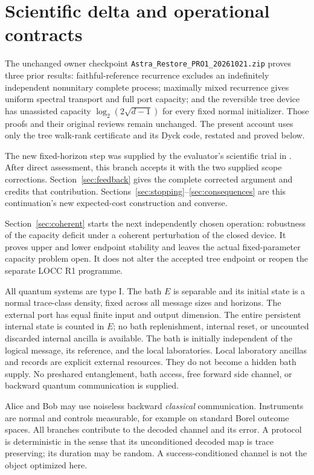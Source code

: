 \documentclass[11pt]{article}
\begin{document}
\section{Scientific delta and operational contracts}

The unchanged owner checkpoint \texttt{Astra\_Restore\_PRO1\_20261021.zip} proves three prior results: faithful-reference recurrence excludes an indefinitely independent nonunitary complete process; maximally mixed recurrence gives uniform spectral transport and full port capacity; and the reversible tree device has unassisted capacity $\log_2(2\sqrt{d-1})$ for every fixed normal initializer. Those proofs and their original reviews remain unchanged. The present account uses only the tree walk-rank certificate and its Dyck code, restated and proved below.

The new fixed-horizon step was supplied by the evaluator's scientific trial in . After direct assessment, this branch accepts it with the two supplied scope corrections. Section~\ref{sec:feedback} gives the complete corrected argument and credits that contribution. Sections~\ref{sec:stopping}--\ref{sec:consequences} are this continuation's new expected-cost construction and converse.

Section~\ref{sec:coherent} starts the next independently chosen operation: robustness of the capacity deficit under a coherent perturbation of the closed device. It proves upper and lower endpoint stability and leaves the actual fixed-parameter capacity problem open. It does not alter the accepted tree endpoint or reopen the separate LOCC R1 programme.

All quantum systems are type I. The bath $E$ is separable and its initial state is a normal trace-class density, fixed across all message sizes and horizons. The external port has equal finite input and output dimension. The entire persistent internal state is counted in $E$; no bath replenishment, internal reset, or uncounted discarded internal ancilla is available. The bath is initially independent of the logical message, its reference, and the local laboratories. Local laboratory ancillas and records are explicit external resources. They do not become a hidden bath supply. No preshared entanglement, bath access, free forward side channel, or backward quantum communication is supplied.

Alice and Bob may use noiseless backward \emph{classical} communication. Instruments are normal and controls measurable, for example on standard Borel outcome spaces. All branches contribute to the decoded channel and its error. A protocol is deterministic in the sense that its unconditioned decoded map is trace preserving; its duration may be random. A success-conditioned channel is not the object optimized here.
\end{document}
